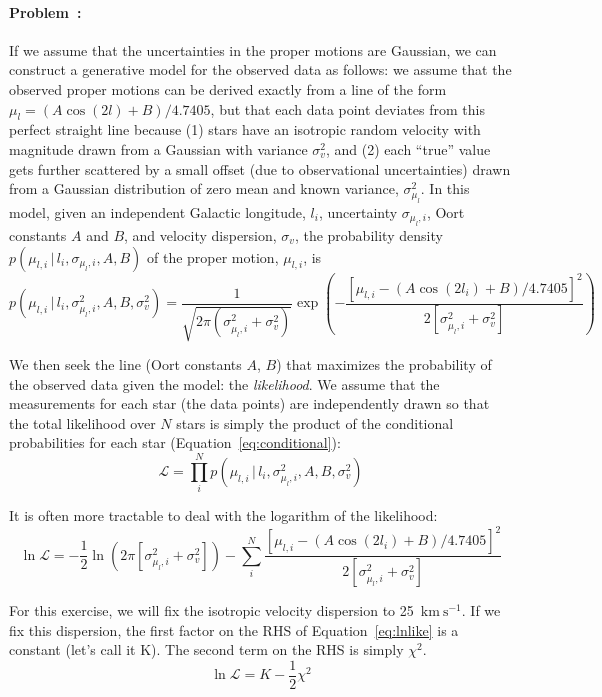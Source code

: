 \documentclass[12pt,twoside]{article}
\newcommand{\given}{\,|\,}
\newcommand{\kms}{$\mathrm{km}~\mathrm{s}^{-1}$}
\newcommand{\problemname}{Problem}
\newcounter{problem}
\newenvironment{problem}{\paragraph{\problemname~\theproblem:}\refstepcounter{problem}}{}
\begin{document}
\begin{problem}
If we assume that the uncertainties in the proper motions are Gaussian, we can construct a generative model for the observed data as follows: we assume that the observed proper motions can be derived exactly from a line of the form $\mu_l = (A\cos(2l) + B) / 4.7405$, but that each data point deviates from this perfect straight line because (1) stars have an isotropic random velocity with magnitude drawn from a Gaussian with variance $\sigma_v^2$, and (2) each ``true'' value gets further scattered by a small offset (due to observational uncertainties) drawn from a Gaussian distribution of zero mean and known variance, $\sigma^2_{\mu_l}$. In this model, given an independent Galactic longitude, $l_i$, uncertainty $\sigma_{\mu_l, i}$, Oort constants $A$ and $B$, and velocity dispersion, $\sigma_v$, the probability density $p(\mu_{l,i} \given l_i, \sigma_{\mu_l,i}, A, B)$ of the proper motion, $\mu_{l,i}$, is
\begin{equation}
	p(\mu_{l,i} \given l_i, \sigma^2_{\mu_l,i}, A, B, \sigma_v^2) = \frac{1}{\sqrt{2\pi (\sigma_{\mu_l,i}^2 + \sigma_v^2)}}\exp \left( - \frac{[\mu_{l,i} - (A\cos(2l_i) + B) / 4.7405]^2}{2[\sigma_{\mu_l,i}^2 + \sigma_v^2]}\right)\label{eq:conditional}
\end{equation}

We then seek the line (Oort constants $A$, $B$) that maximizes the probability of the observed data given the model: the \emph{likelihood}. We assume that the measurements for each star (the data points) are independently drawn so that the total likelihood over $N$ stars is simply the product of the conditional probabilities for each star (Equation~\ref{eq:conditional}):
\begin{equation}
	\mathcal{L} = \prod^N_i p(\mu_{l,i} \given l_i, \sigma^2_{\mu_l,i}, A, B, \sigma_v^2)
\end{equation}

It is often more tractable to deal with the logarithm of the likelihood:
\begin{equation}
	\ln \mathcal{L} = -\frac{1}{2}\ln(2\pi[\sigma_{\mu_l,i}^2 + \sigma_v^2]) - \sum^N_i \frac{[\mu_{l,i} - (A\cos(2l_i) + B) / 4.7405]^2}{2[\sigma_{\mu_l,i}^2 + \sigma_v^2]}\label{eq:lnlike}
\end{equation}

For this exercise, we will fix the isotropic velocity dispersion to 25~\kms. If we fix this dispersion, the first factor on the RHS of Equation~\ref{eq:lnlike} is a constant (let's call it K). The second term on the RHS is simply $\chi^2$.
\begin{equation}
	\ln \mathcal{L} = K - \frac{1}{2}\chi^2
\end{equation}


\end{problem}
\end{document}
